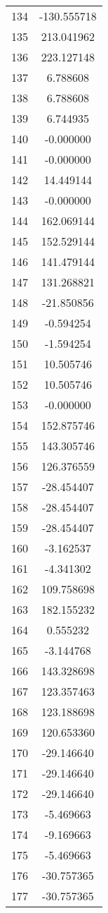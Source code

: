 \documentclass[12pt]{article}
\begin{document}
\begin{longtable}{@{}cc@{}}
134 & -130.555718 \\
135 & 213.041962 \\
136 & 223.127148 \\
137 & 6.788608 \\
138 & 6.788608 \\
139 & 6.744935 \\
140 & -0.000000 \\
141 & -0.000000 \\
142 & 14.449144 \\
143 & -0.000000 \\
144 & 162.069144 \\
145 & 152.529144 \\
146 & 141.479144 \\
147 & 131.268821 \\
148 & -21.850856 \\
149 & -0.594254 \\
150 & -1.594254 \\
151 & 10.505746 \\
152 & 10.505746 \\
153 & -0.000000 \\
154 & 152.875746 \\
155 & 143.305746 \\
156 & 126.376559 \\
157 & -28.454407 \\
158 & -28.454407 \\
159 & -28.454407 \\
160 & -3.162537 \\
161 & -4.341302 \\
162 & 109.758698 \\
163 & 182.155232 \\
164 & 0.555232 \\
165 & -3.144768 \\
166 & 143.328698 \\
167 & 123.357463 \\
168 & 123.188698 \\
169 & 120.653360 \\
170 & -29.146640 \\
171 & -29.146640 \\
172 & -29.146640 \\
173 & -5.469663 \\
174 & -9.169663 \\
175 & -5.469663 \\
176 & -30.757365 \\
177 & -30.757365 \\

\end{longtable}
\end{document}
